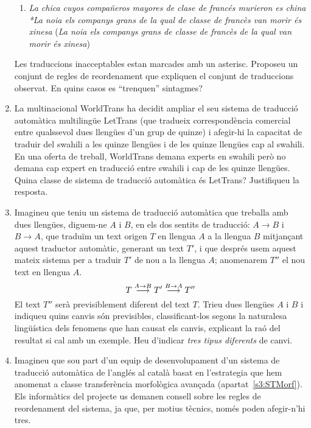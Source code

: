 \begin{enumerate}
\begin{enumerate}
\item \emph{La chica cuyos compañeros mayores de clase de francés murieron es
    china} \newline \emph{*La noia els companys grans de la qual de
    classe de
    francès van morir és xinesa} \newline (\emph{La noia els companys grans
    de classe de francès de la qual van morir és xinesa})

\end{enumerate}
Les traduccions inacceptables estan marcades amb un asterisc.
Proposeu un conjunt de regles de reordenament que expliquen el conjunt de
traduccions observat. En quins casos es ``trenquen'' sintagmes?

\item La multinacional WorldTrans ha decidit ampliar el seu sistema de
  traducció automàtica multilingüe LetTrans (que tradueix
  correspondència comercial entre qualssevol dues llengües d'un grup
  de quinze) i afegir-hi la capacitat de traduir del swahili a les
  quinze llengües i de les quinze llengües cap al swahili. En una
  oferta de treball, WorldTrans demana experts en swahili però no
  demana cap expert en traducció entre swahili i cap de les quinze
  llengües. Quina classe de sistema de traducció automàtica és
  LetTrans?  Justifiqueu la resposta.

  \item Imagineu que teniu un sistema de traducció automàtica que
    treballa amb dues llengües, diguem-ne $A$ i $B$, en els dos
    sentits de traducció: $A{\rightarrow}B$ i $B{\rightarrow}A$, que
    traduïm un text origen $T$ en llengua $A$ a la llengua $B$
    mitjançant aquest traductor automàtic, generant un text $T'$, i
    que després usem aquest mateix sistema per a traduir $T'$ de nou a
    la llengua $A$; anomenarem $T''$ el nou text en llengua $A$.
      \begin{equation}
        T \stackrel{\scriptsize A\rightarrow
        B}{\longrightarrow}T'\stackrel{\scriptsize B\rightarrow
        A}{\longrightarrow} T''
      \end{equation}
      El text $T''$ serà previsiblement diferent del text $T$.  Trieu
      dues llengües $A$ i $B$ i indiqueu quins canvis són previsibles,
      classificant-los segons la naturalesa lingüística dels fenomens
      que han causat els canvis, explicant la raó del resultat si cal
      amb un exemple. Heu d'indicar \emph{tres tipus diferents} de
      canvi.

    \item Imagineu que sou part d'un equip de desenvolupament d'un
      sistema de traducció automàtica de l'anglés al català basat en
      l'estrategia que hem anomenat a classe transferència morfològica
      avançada (apartat~\ref{s3:STMorf}). Els informàtics del projecte us demanen consell sobre
      les regles de reordenament del sistema, ja que, per motius
      tècnics, només poden afegir-n'hi tres.
      

\end{enumerate}
